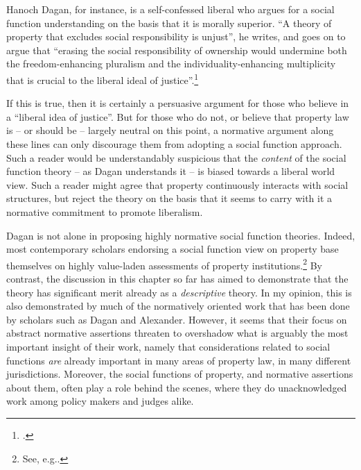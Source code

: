Hanoch Dagan, for instance, is a self-confessed liberal who argues for a social function understanding on the basis that it is morally superior. ``A theory of property that excludes social responsibility is unjust'', he writes, and goes on to argue that ``erasing the social responsibility of ownership would undermine both the freedom-enhancing pluralism and the individuality-enhancing multiplicity that is crucial to the liberal ideal of justice''.\footcite[1259]{dagan07}

If this is true, then it is certainly a persuasive argument for those who believe in a ``liberal idea of justice''. But for those who do not, or believe that property law is -- or should be -- largely neutral on this point, a normative argument along these lines can only discourage them from adopting a social function approach. Such a reader would be understandably suspicious that the {\it content} of the social function theory -- as Dagan understands it -- is biased towards a liberal world view. Such a reader might agree that property continuously interacts with social structures, but reject the theory on the basis that it seems to carry with it a normative commitment to promote liberalism.

Dagan is not alone in proposing highly normative social function theories. Indeed, most contemporary scholars endorsing a social function view on property base themselves on highly value-laden assessments of property institutions.\footnote{See, e.g.\cite{alexander09,crawford11,davidson11,singer09,penalver09}.} By contrast, the discussion in this chapter so far has aimed to demonstrate that the theory has significant merit already as a {\it descriptive} theory. In my opinion, this is also demonstrated by much of the normatively oriented work that has been done by scholars such as Dagan and Alexander. However, it seems that their focus on abstract normative assertions threaten to overshadow what is arguably the most important insight of their work, namely that considerations related to social functions {\it are} already important in many areas of property law, in many different jurisdictions. Moreover, the social functions of property, and normative assertions about them, often play a role behind the scenes, where they do unacknowledged work among policy makers and judges alike.

